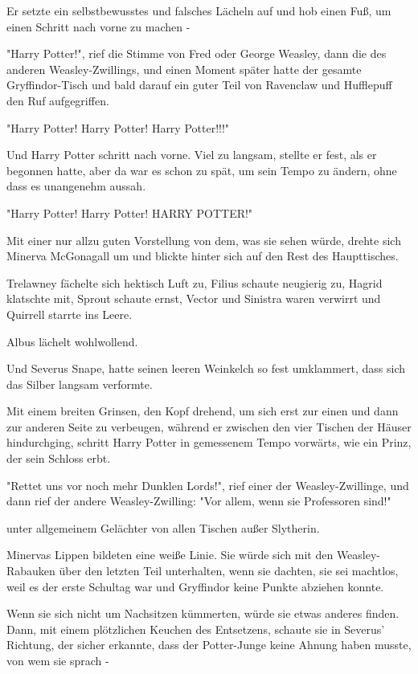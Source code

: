 {Er setzte ein selbstbewusstes und falsches Lächeln auf und hob einen Fuß, um einen Schritt nach vorne zu machen -

"Harry Potter!", rief die Stimme von Fred oder George Weasley, dann die des anderen Weasley-Zwillings, und einen Moment später hatte der gesamte Gryffindor-Tisch und bald darauf ein guter Teil von Ravenclaw und Hufflepuff den Ruf aufgegriffen.

"Harry Potter! Harry Potter! Harry Potter!!!"

Und Harry Potter schritt nach vorne. Viel zu langsam, stellte er fest, als er begonnen hatte, aber da war es schon zu spät, um sein Tempo zu ändern, ohne dass es unangenehm aussah.

"Harry Potter! Harry Potter! HARRY POTTER!"

Mit einer nur allzu guten Vorstellung von dem, was sie sehen würde, drehte sich Minerva McGonagall um und blickte hinter sich auf den Rest des Haupttisches.

Trelawney fächelte sich hektisch Luft zu, Filius schaute neugierig zu, Hagrid klatschte mit, Sprout schaute ernst, Vector und Sinistra waren verwirrt und Quirrell starrte ins Leere.

Albus lächelt wohlwollend.

Und Severus Snape, hatte seinen leeren Weinkelch so fest umklammert, dass sich das Silber langsam verformte.

Mit einem breiten Grinsen, den Kopf drehend, um sich erst zur einen und dann zur anderen Seite zu verbeugen, während er zwischen den vier Tischen der Häuser hindurchging, schritt Harry Potter in gemessenem Tempo vorwärts, wie ein Prinz, der sein Schloss erbt.

"Rettet uns vor noch mehr Dunklen Lords!", rief einer der Weasley-Zwillinge, und dann rief der andere Weasley-Zwilling: "Vor allem, wenn sie Professoren sind!"

unter allgemeinem Gelächter von allen Tischen außer Slytherin.

Minervas Lippen bildeten eine weiße Linie. Sie würde sich mit den Weasley-Rabauken über den letzten Teil unterhalten, wenn sie dachten, sie sei machtlos, weil es der erste Schultag war und Gryffindor keine Punkte abziehen konnte.

Wenn sie sich nicht um Nachsitzen kümmerten, würde sie etwas anderes finden. Dann, mit einem plötzlichen Keuchen des Entsetzens, schaute sie in Severus' Richtung, der sicher erkannte, dass der Potter-Junge keine Ahnung haben musste, von wem sie sprach -

}
